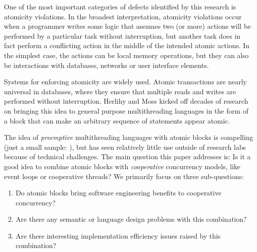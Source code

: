 \documentclass[acmsmall,anonymous,review]{acmart}\settopmatter{printfolios=true,printccs=false,printacmref=false}
\begin{document}

One of the most important categories of defects identified by this research is atomicity violations.
In the broadest interpretation, atomicity violations occur when a programmer writes some logic that assumes two (or more) actions will be performed by a particular task without interruption, but another task does in fact perform a conflicting action in the middle of the intended atomic actions.
In the simplest case, the actions can be local memory operations, but they can also be interactions with databases, networks or user interface elements.

Systems for enforcing atomicity are widely used.
Atomic transactions are nearly universal in databases, where they ensure that multiple reads and writes are performed without interruption.
Herlihy and Moss \cite{Herlihy1993} kicked off decades of research on bringing this idea to general purpose multithreading languages in the form of a block that can make an arbitrary sequence of statements appear atomic.



The idea of \emph{preemptive} multithreading languages with atomic blocks is compelling (just a small sample: \cite{Harris2003, Harris2005, Ringenburg2005, Herlihy2006, Ni2008}), but has seen relatively little use outside of research labs because of technical challenges.
The main question this paper addresses is: Is it a good idea to combine atomic blocks with \emph{cooperative} concurrency models, like event loops or cooperative threads?
We primarily focus on three sub-questions:
\begin{enumerate}
\item Do atomic blocks bring software engineering benefits to cooperative concurrency?
\item Are there any semantic or language design problems with this combination?
\item Are there interesting implementation efficiency issues raised by this combination?
\end{enumerate}
\end{document}
